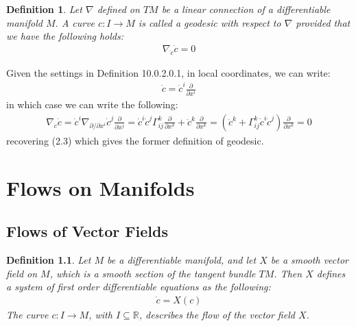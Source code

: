 \documentclass[11pt]{book}
\theoremstyle{break}
\theoremstyle{break}
\newtheorem{defn}{Definition}[corL]
\newcommand{\R}{\mathbb{R}}
\newcommand{\pd}{\partial}
\begin{document}
\begin{defn}
Let $\nabla$ defined on $TM$ be a linear connection of a differentiable manifold $M$. A curve $c: I  \to M$ is called a geodesic with respect to $\nabla$ provided that we have the following holds:
\begin{align*}
\nabla_{\dot{c}}\dot{c} = 0
\end{align*}
\end{defn}
Given the settings in Definition 10.0.2.0.1, in local coordinates, we can write:
\begin{align*}
\dot{c} = \dot{c}^i \frac{\pd}{\pd x^i}
\end{align*}
in which case we can write the following:
\begin{align*}
\nabla_{\dot{c}}\dot{c} = \dot{c}^i \nabla_{\pd/\pd x^i}\dot{c}^j \frac{\pd}{\pd x^j} = \dot{c}^i \dot{ c}^j \Gamma_{ij}^k \frac{\pd}{\pd x^k} + \ddot{c}^k \frac{\pd}{\pd x^k} = \left(\ddot{c}^k + \Gamma_{ij}^k \dot{c}^i \dot{c}^j \right)\frac{\pd}{\pd x^k} =0
\end{align*}
recovering (2.3) which gives the former definition of geodesic. \\



\newpage
\chapter{Flows on Manifolds}
\setcounter{section}{10}
\section[Flows of Vector Fields]{\color{red}Flows of Vector Fields\color{black}}
\begin{defn}
Let $M$ be a differentiable manifold, and let $X$ be a smooth vector field on $M$, which is a smooth section of the tangent bundle $TM$. Then $X$ defines a system of first order differentiable equations as the following:
\begin{align*}
\dot{c} = X(c)
\end{align*}
The curve $c:I \to M$, with $I \subseteq \R$, describes the flow of the vector field $X$.  
\end{defn}
\end{document}
